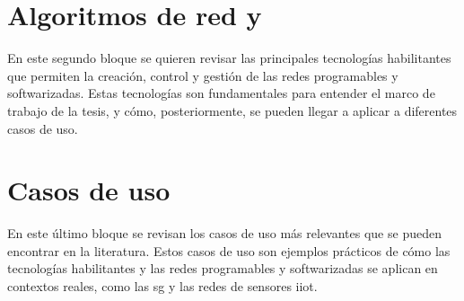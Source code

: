 \section{Algoritmos de red y }
\label{sec:tecnologias_habilitantes}

En este segundo bloque se quieren revisar las principales tecnologías habilitantes que permiten la creación, control y gestión de las redes programables y softwarizadas. Estas tecnologías son fundamentales para entender el marco de trabajo de la tesis, y cómo, posteriormente, se pueden llegar a aplicar a diferentes casos de uso. 


\section{Casos de uso}  
\label{sec:casos_de_uso}
En este último bloque se revisan los casos de uso más relevantes que se pueden encontrar en la literatura. Estos casos de uso son ejemplos prácticos de cómo las tecnologías habilitantes y las redes programables y softwarizadas se aplican en contextos reales, como las \gls{sg} y las redes de sensores \gls{iiot}. 
